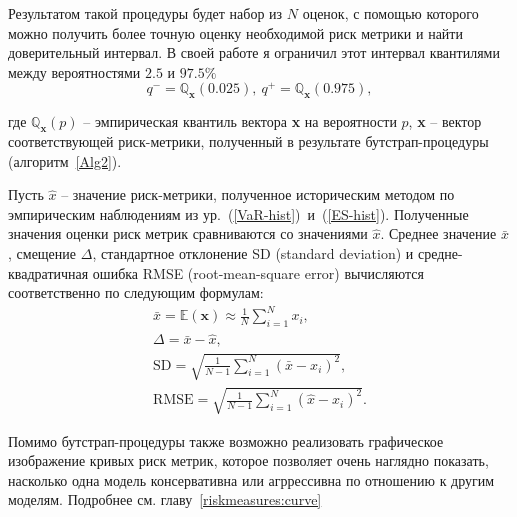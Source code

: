 Результатом такой процедуры будет набор из $N$ оценок, с помощью которого можно получить более точную оценку необходимой риск метрики и найти доверительный интервал. 
В своей работе я ограничил этот интервал квантилями между вероятностями $2.5$ и $97.5\%$
%
\begin{equation} \label{boot-conf-area}
    q^- = \mathbb{Q}_{\textbf{x}} (0.025), \ q^+ = \mathbb{Q}_{\textbf{x}} (0.975),
\end{equation}

\noindent где $\mathbb{Q}_{\textbf{x}} (p)$ -- эмпирическая квантиль вектора \textbf{x} на вероятности $p$, \textbf{x} -- вектор соответствующей риск-метрики, полученный в результате бутстрап-процедуры (алгоритм~\ref{Alg2}).

Пусть $\hat{x}$ -- значение риск-метрики, полученное историческим методом по эмпирическим наблюдениям из ур.~(\ref{VaR-hist})~и~(\ref{ES-hist}).
Полученные значения оценки риск метрик сравниваются со значениями $\hat{x}$.
Среднее значение $\bar{x}$, смещение $\Delta$, стандартное отклонение SD (standard deviation) и средне-квадратичная ошибка RMSE (root-mean-square error) вычисляются соответственно по следующим формулам:
%
\begin{gather}
\bar{x} = \mathbb{E} (\textbf{x}) \approx \frac{1}{N} \sum_{i=1}^N x_i, \label{boot-mean} \\
\Delta = \bar{x} - \hat{x}, \label{boot-bias} \\
\text{SD} = \sqrt{\frac{1}{N-1} \sum_{i=1}^N (\bar{x} - x_i)^2}, \label{boot-sd} \\
\text{RMSE} = \sqrt{\frac{1}{N-1} \sum_{i=1}^N (\hat{x} - x_i)^2}. \label{boot-rmse}
\end{gather}

Помимо бутстрап-процедуры также возможно реализовать графическое изображение кривых риск метрик, которое позволяет очень наглядно показать, насколько одна модель консервативна или агррессивна по отношению к другим моделям. Подробнее см. главу~\ref{riskmeasures:curve}